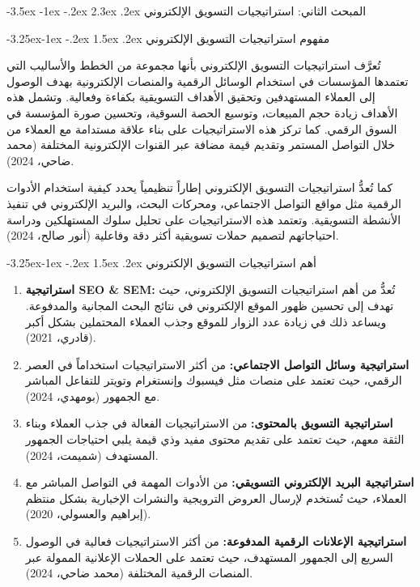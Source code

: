 \documentclass[12pt, a4paper]{report}
\makeatletter
\newcommand{\lr}[1]{\textenglish{#1}}
\renewcommand\section{\@startsection{section}{1}{\z@}%
  {-3.5ex \@plus -1ex \@minus -.2ex}%
  {2.3ex \@plus .2ex}%
  {\normalfont\Large\bfseries\color{primaryblue}}}
\renewcommand\subsection{\@startsection{subsection}{2}{\z@}%
  {-3.25ex\@plus -1ex \@minus -.2ex}%
  {1.5ex \@plus .2ex}%
  {\normalfont\large\bfseries\color{sectiongray}}}
\makeatother
\begin{document}
\section{المبحث الثاني: استراتيجيات التسويق الإلكتروني}

\subsection{مفهوم استراتيجيات التسويق الإلكتروني}

تُعرَّف استراتيجيات التسويق الإلكتروني بأنها مجموعة من الخطط والأساليب التي تعتمدها المؤسسات في استخدام الوسائل الرقمية والمنصات الإلكترونية بهدف الوصول إلى العملاء المستهدفين وتحقيق الأهداف التسويقية بكفاءة وفعالية. وتشمل هذه الأهداف زيادة حجم المبيعات، وتوسيع الحصة السوقية، وتحسين صورة المؤسسة في السوق الرقمي. كما تركز هذه الاستراتيجيات على بناء علاقة مستدامة مع العملاء من خلال التواصل المستمر وتقديم قيمة مضافة عبر القنوات الإلكترونية المختلفة (محمد ضاحي، 2024).

كما تُعدُّ استراتيجيات التسويق الإلكتروني إطاراً تنظيمياً يحدد كيفية استخدام الأدوات الرقمية مثل مواقع التواصل الاجتماعي، ومحركات البحث، والبريد الإلكتروني في تنفيذ الأنشطة التسويقية. وتعتمد هذه الاستراتيجيات على تحليل سلوك المستهلكين ودراسة احتياجاتهم لتصميم حملات تسويقية أكثر دقة وفاعلية (أنور صالح، 2024).

\subsection{أهم استراتيجيات التسويق الإلكتروني}

\begin{enumerate}[label=\arabic*.]
  \item \textbf{استراتيجية \lr{SEO \& SEM}:} تُعدُّ من أهم استراتيجيات التسويق الإلكتروني، حيث تهدف إلى تحسين ظهور الموقع الإلكتروني في نتائج البحث المجانية والمدفوعة. ويساعد ذلك في زيادة عدد الزوار للموقع وجذب العملاء المحتملين بشكل أكبر (قادري، 2021).
  \item \textbf{استراتيجية وسائل التواصل الاجتماعي:} من أكثر الاستراتيجيات استخداماً في العصر الرقمي، حيث تعتمد على منصات مثل فيسبوك وإنستغرام وتويتر للتفاعل المباشر مع الجمهور (بومهدي، 2024).
  \item \textbf{استراتيجية التسويق بالمحتوى:} من الاستراتيجيات الفعالة في جذب العملاء وبناء الثقة معهم، حيث تعتمد على تقديم محتوى مفيد وذي قيمة يلبي احتياجات الجمهور المستهدف (شميمت، 2024).
  \item \textbf{استراتيجية البريد الإلكتروني التسويقي:} من الأدوات المهمة في التواصل المباشر مع العملاء، حيث تُستخدم لإرسال العروض الترويجية والنشرات الإخبارية بشكل منتظم (إبراهيم والعسولي، 2020).
  \item \textbf{استراتيجية الإعلانات الرقمية المدفوعة:} من أكثر الاستراتيجيات فعالية في الوصول السريع إلى الجمهور المستهدف، حيث تعتمد على الحملات الإعلانية الممولة عبر المنصات الرقمية المختلفة (محمد ضاحي، 2024).
\end{enumerate}
\end{document}
